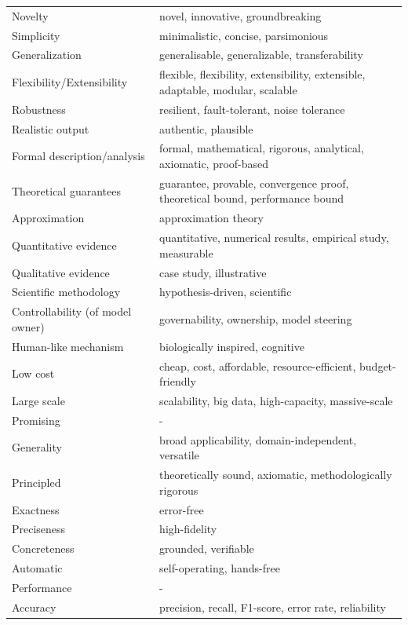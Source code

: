 \documentclass{article}
\begin{document}
\begin{longtable}{|p{5cm}|p{10cm}|}
    Novelty & novel, innovative, groundbreaking \\ 
    Simplicity & minimalistic, concise, parsimonious \\ 
    Generalization & generalisable, generalizable, transferability \\ 
    Flexibility/Extensibility & flexible, flexibility, extensibility, extensible, adaptable, modular, scalable \\ 
    Robustness & resilient, fault-tolerant, noise tolerance \\ 
    Realistic output & authentic, plausible \\ 
    Formal description/analysis & formal, mathematical, rigorous, analytical, axiomatic, proof-based \\ 
    Theoretical guarantees & guarantee, provable, convergence proof, theoretical bound, performance bound \\ 
    Approximation & approximation theory \\ 
    Quantitative evidence & quantitative, numerical results, empirical study, measurable \\ 
    Qualitative evidence & case study, illustrative \\ 
    Scientific methodology & hypothesis-driven, scientific \\ 
    Controllability (of model owner) & governability, ownership, model steering \\ 
    Human-like mechanism & biologically inspired, cognitive \\ 
    Low cost & cheap, cost, affordable, resource-efficient, budget-friendly \\ 
    Large scale & scalability, big data, high-capacity, massive-scale \\ 
    Promising & - \\ 
    Generality & broad applicability, domain-independent, versatile \\ 
    Principled & theoretically sound, axiomatic, methodologically rigorous \\ 
    Exactness & error-free \\ 
    Preciseness & high-fidelity \\ 
    Concreteness & grounded, verifiable \\ 
    Automatic & self-operating, hands-free \\ 
    Performance & - \\ 
    Accuracy & precision, recall, F1-score, error rate, reliability \\ 

\end{longtable}
\end{document}
